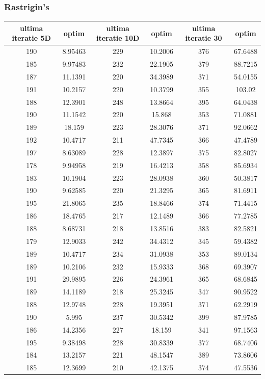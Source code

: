 \documentclass{article}
\begin{document}
\subsubsection{Rastrigin’s}
\begin{tabular}{cccccc}
\hline
ultima iteratie 5D& optim&ultima iteratie 10D& optim&ultima iteratie 30&optim\\
\hline
190&8.95463&229&10.2006&376&67.6488 \\ \hline
185&9.97483&232&22.1905&379&88.7215 \\ \hline
187&11.1391&220&34.3989&371&54.0155 \\ \hline
191&10.2157&220&10.3799&355&103.02 \\ \hline
188&12.3901&248&13.8664&395&64.0438 \\ \hline
190&11.1542&220&15.868&353&71.0881 \\ \hline
189&18.159&223&28.3076&371&92.0662 \\ \hline
192&10.4717&211&47.7345&366&47.4789 \\ \hline
197&8.63089&228&12.3897&375&82.8027 \\ \hline
178&9.94958&219&16.4213&358&85.6934 \\ \hline
183&10.1904&223&28.0938&360&50.3817 \\ \hline
190&9.62585&220&21.3295&365&81.6911 \\ \hline
195&21.8065&235&18.8466&374&71.4415 \\ \hline
186&18.4765&217&12.1489&366&77.2785 \\ \hline
188&8.68731&218&13.8516&383&82.5821 \\ \hline
179&12.9033&242&34.4312&345&59.4382 \\ \hline
189&10.4717&234&31.0938&353&89.0134 \\ \hline
189&10.2106&232&15.9333&368&69.3907 \\ \hline
191&29.9895&226&24.3961&365&68.6845 \\ \hline
189&14.1189&218&25.3245&347&90.9522 \\ \hline
188&12.9748&228&19.3951&371&62.2919 \\ \hline
190&5.995&237&30.5342&399&87.9785 \\ \hline
186&14.2356&227&18.159&341&97.1563 \\ \hline
195&9.38498&228&30.8339&377&68.7406 \\ \hline
184&13.2157&221&48.1547&389&73.8606 \\ \hline
185&12.3699&210&42.1375&374&47.5536 \\ \hline

\end{tabular}
\end{document}
